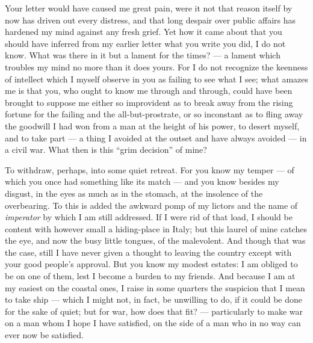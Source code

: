 

 Your letter would have caused me great pain, were it not that reason itself by now has driven out every distress, and that long despair over public affairs has hardened my mind against any fresh grief. Yet how it came about that you should have inferred from my earlier letter what you write you did, I do not know. What was there in it but a lament for the times? --- a lament which troubles my mind no more than it does yours. For I do not recognize the keenness of intellect which I myself observe in you as failing to see what I see; what amazes me is that you, who ought to know me through and through, could have been brought to suppose me either so improvident as to break away from the rising fortune for the failing and the all-but-prostrate, or so inconstant as to fling away the goodwill I had won from a man at the height of his power, to desert myself, and to take part --- a thing I avoided at the outset and have always avoided --- in a civil war. What then is this ``grim decision'' of mine?

 To withdraw, perhaps, into some quiet retreat. For you know my temper --- of which you once had something like its match --- and you know besides my disgust, in the eyes as much as in the stomach, at the insolence of the overbearing. To this is added the awkward pomp of my lictors and the name of \textit{imperator} by which I am still addressed. If I were rid of that load, I should be content with however small a hiding-place in Italy; but this laurel of mine catches the eye, and now the busy little tongues, of the malevolent. And though that was the case, still I have never given a thought to leaving the country except with your good people's approval. But you know my modest estates: I am obliged to be on one of them, lest I become a burden to my friends. And because I am at my easiest on the coastal ones, I raise in some quarters the suspicion that I mean to take ship --- which I might not, in fact, be unwilling to do, if it could be done for the sake of quiet; but for war, how does that fit? --- particularly to make war on a man whom I hope I have satisfied, on the side of a man who in no way can ever now be satisfied.

